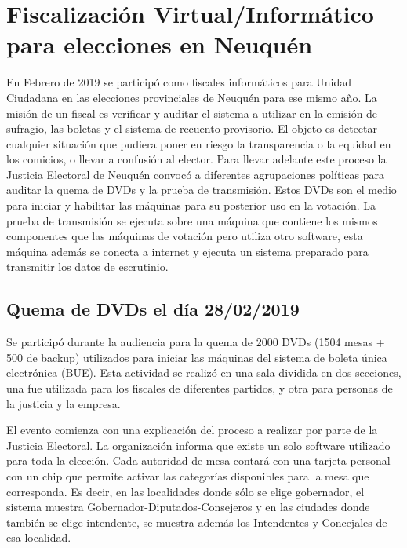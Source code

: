 \label{Anexos}
\appendix
\clearpage
\addappheadtotoc
\appendixpage
\chapter[Fisc. Virtual/Inf. para elecciones en Neuquén]{Fiscalización Virtual/Informático para elecciones en Neuquén}
\label{fiscalizacionNeuquen}
En Febrero de 2019 se participó como fiscales informáticos para Unidad Ciudadana en las elecciones provinciales de Neuquén para ese mismo año. La misión de un fiscal es verificar y auditar el sistema a utilizar en la emisión de sufragio, las boletas y el sistema de recuento provisorio. El objeto es detectar cualquier situación que pudiera poner en riesgo la transparencia o la equidad en los comicios, o llevar a confusión al elector. Para llevar adelante este proceso la Justicia Electoral de Neuquén convocó a diferentes agrupaciones políticas para auditar la quema de DVDs y la prueba de transmisión. Estos DVDs son el medio para iniciar y habilitar las máquinas para su posterior uso en la votación. La prueba de transmisión se ejecuta sobre una máquina que contiene los mismos componentes que las máquinas de votación pero utiliza otro software, esta máquina además se conecta a internet y ejecuta un sistema preparado para transmitir los datos de escrutinio. 

\section{Quema de DVDs el día 28/02/2019}
Se participó durante la audiencia para la quema de 2000 DVDs (1504 mesas + 500 de backup) utilizados para iniciar las máquinas del sistema de boleta única electrónica (BUE). \newline
Esta actividad se realizó en una sala dividida en dos secciones, una fue utilizada para los fiscales de diferentes partidos, y otra para personas de la justicia y la empresa.

El evento comienza con una explicación del proceso a realizar por parte de la Justicia Electoral.  La organización informa que existe un solo software utilizado para toda la elección. Cada autoridad de mesa contará con una tarjeta personal con un chip que permite activar las categorías disponibles para la mesa que corresponda. Es decir, en las localidades donde sólo se elige gobernador, el sistema muestra Gobernador-Diputados-Consejeros y en las ciudades donde también se elige intendente, se muestra además los Intendentes y Concejales de esa localidad.

